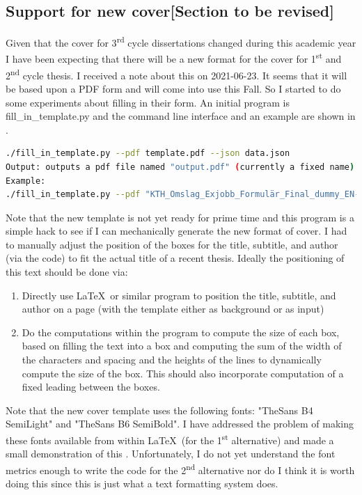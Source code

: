 \subsection{Support for new cover[Section to be revised]}
Given that the cover for 3\textsuperscript{rd} cycle dissertations changed during this academic year I have been expecting that there will be a new format for the cover for 1\textsuperscript{st} and 2\textsuperscript{nd} cycle thesis. I received a note about this on 2021-06-23. It seems that it will be based upon a PDF form and will come into use this Fall. So I started to do some experiments about filling in their form. An initial program is fill\_in\_template.py and the command line interface and an example are shown in .
\begin{lstlisting}[language={bash}, caption={New fill\_in\_template.py program}, label=lst:newfillinTemplae]
./fill_in_template.py --pdf template.pdf --json data.json
Output: outputs a pdf file named "output.pdf" (currently a fixed name)
Example:
./fill_in_template.py --pdf "KTH_Omslag_Exjobb_Formulär_Final_dummy_EN-20210623.pdf" –json xxxx.json --trita "TRITA-EECS-EX-2021:330"
\end{lstlisting}

Note that the new template is not yet ready for prime time and this program is a simple hack to see if I can mechanically generate the new format of cover. I had to manually adjust the position of the boxes for the title, subtitle, and author (via the code) to fit the actual title of a recent thesis. Ideally the positioning of this text should be done via:
\begin{enumerate}
\item Directly use \LaTeX~or similar program to position the title, subtitle, and author on a page (with the template either as background or as input)

\item Do the computations within the program to compute the size of each box, based on filling the text into a box and computing the sum of the width of the characters and spacing and the heights of the lines to dynamically compute the size of the box. This should also incorporate computation of a fixed leading between the boxes.
\end{enumerate}

Note that the new cover template uses the following fonts: "TheSans B4 SemiLight" and "TheSans B6 SemiBold". I have addressed the problem of making these fonts available from within \LaTeX~(for the 1\textsuperscript{st} alternative) and made a small demonstration of this . Unfortunately, I do not yet understand the font metrics enough to write the code for the 2\textsuperscript{nd} alternative nor do I think it is worth doing this since this is just what a text formatting system does.

